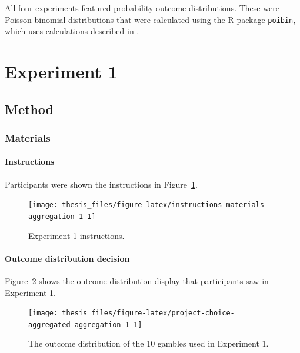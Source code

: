 \documentclass[a4paper, nobind, dvipsnames]{templates/ociamthesis}
\theoremstyle{definition}
\theoremstyle{definition}
\theoremstyle{definition}
\theoremstyle{definition}
\theoremstyle{remark}
\begin{document}
All four experiments featured probability outcome distributions. These were
Poisson binomial distributions that were calculated using the R package
\texttt{poibin}, which uses calculations described in \textcite{hong2013}.

\section{Experiment 1}

\subsection{Method}

\subsubsection{Materials}

\hypertarget{instructions-materials-aggregation-1-appendix}{%
\paragraph{Instructions}\label{instructions-materials-aggregation-1-appendix}}

Participants were shown the instructions in
Figure~\ref{fig:instructions-materials-aggregation-1}.



\begin{figure}
\texttt{[image: thesis\_files/figure-latex/instructions-materials-aggregation-1-1]} \caption{Experiment 1 instructions.}\label{fig:instructions-materials-aggregation-1}
\end{figure}

\hypertarget{outcome-distribution-materials-aggregation-1-appendix}{%
\paragraph{Outcome distribution decision}\label{outcome-distribution-materials-aggregation-1-appendix}}

Figure~\ref{fig:project-choice-aggregated-aggregation-1} shows the outcome
distribution display that participants saw in Experiment 1.



\begin{figure}
\texttt{[image: thesis\_files/figure-latex/project-choice-aggregated-aggregation-1-1]} \caption{The outcome distribution of the 10 gambles used in Experiment 1.}\label{fig:project-choice-aggregated-aggregation-1}
\end{figure}
\end{document}
